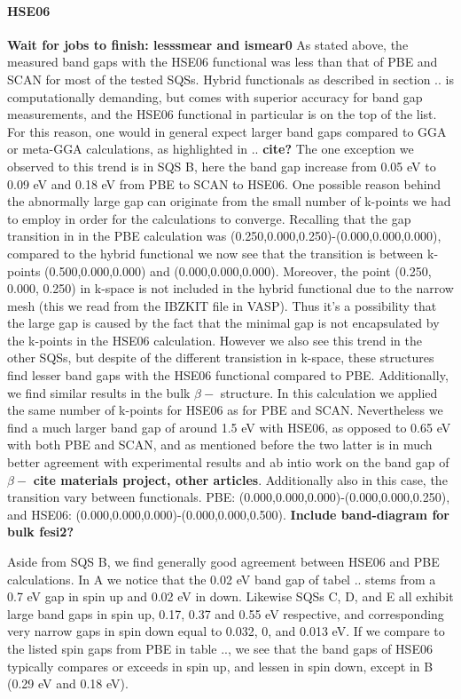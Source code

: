 \paragraph{HSE06 \\}
\textbf{Wait for jobs to finish: lesssmear and ismear0}
As stated above, the measured band gaps with the HSE06 functional was less than that of PBE and SCAN for most of the tested SQSs. Hybrid functionals as described in section .. is computationally demanding, but comes with superior accuracy for band gap measurements, and the HSE06 functional in particular is on the top of the list. For this reason, one would in general expect larger band gaps compared to GGA or meta-GGA calculations, as highlighted in .. \textbf{cite?} The one exception we observed to this trend is in SQS B, here the band gap increase from 0.05 eV to 0.09 eV and 0.18 eV from PBE to SCAN to HSE06. One possible reason behind the abnormally large gap can originate from the small number of k-points we had to employ in order for the calculations to converge. Recalling that the gap transition in in the PBE calculation was (0.250,0.000,0.250)-(0.000,0.000,0.000), compared to the hybrid functional we now see that the transition is between k-points (0.500,0.000,0.000) and (0.000,0.000,0.000). Moreover, the point (0.250, 0.000, 0.250) in k-space is not included in the hybrid functional due to the narrow mesh (this we read from the IBZKIT file in VASP). Thus it's a possibility that the large gap is caused by the fact that the minimal gap is not encapsulated by the k-points in the HSE06 calculation. However we also see this trend in the other SQSs, but despite of the different transistion in k-space, these structures find lesser band gaps with the HSE06 functional compared to PBE. Additionally, we find similar results in the bulk $\beta-$ structure. In this calculation we applied the same number of k-points for HSE06 as for PBE and SCAN. Nevertheless we find a much larger band gap of around 1.5 eV with HSE06, as opposed to 0.65 eV with both PBE and SCAN, and as mentioned before the two latter is in much better agreement with experimental results and ab intio work on the band gap of $\beta-$ \textbf{cite materials project, other articles}. Additionally also in this case, the transition vary between functionals. PBE: (0.000,0.000,0.000)-(0.000,0.000,0.250), and HSE06: (0.000,0.000,0.000)-(0.000,0.000,0.500). \textbf{Include band-diagram for bulk fesi2?} 

Aside from SQS B, we find generally good agreement between HSE06 and PBE calculations. In A  we notice that the 0.02 eV band gap of tabel .. stems from a 0.7 eV gap in spin up and 0.02 eV in down. Likewise SQSs C, D, and E all exhibit large band gaps in spin up, 0.17, 0.37 and 0.55 eV respective, and corresponding very narrow gaps in spin down equal to 0.032, 0, and 0.013 eV. If we compare to the listed spin gaps from PBE in table .., we see that the band gaps of HSE06 typically compares or exceeds in spin up, and lessen in spin down, except in B (0.29 eV and 0.18 eV). 

